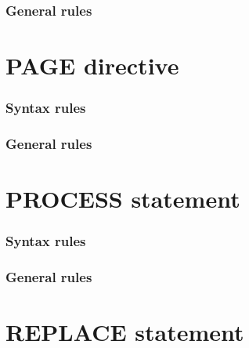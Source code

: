 \subsubsection{General rules}

\section{PAGE directive}

\begin{syntax}
  \directiveindicator{}
  \begin{0-1}
  \end{0-1}
\end{syntax}

\subsubsection{Syntax rules}

\subsubsection{General rules}

\section{PROCESS statement}

\begin{syntax}[\miscextcolour]
\end{syntax}

\subsubsection{Syntax rules}

\subsubsection{General rules}

\section{REPLACE statement}

